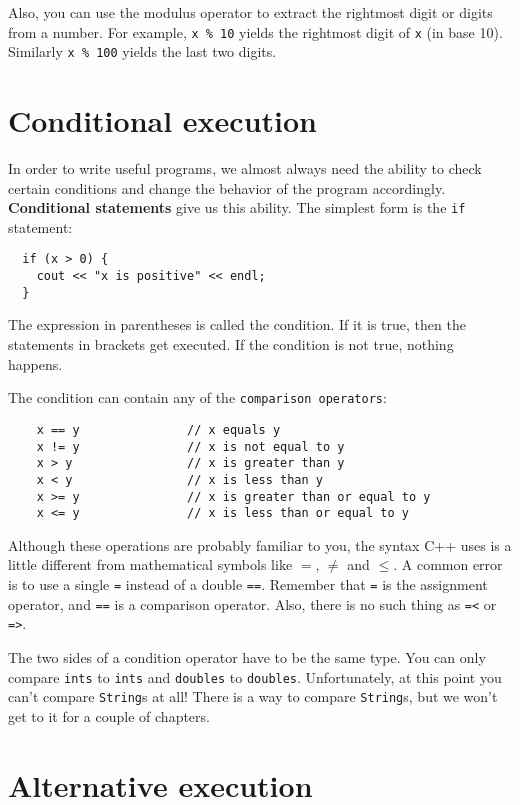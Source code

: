 Also, you can use the modulus operator to extract the rightmost
digit or digits from a number.  For example, {\tt x \% 10} yields
the rightmost digit of {\tt x} (in base 10).  Similarly
{\tt x \% 100} yields the last two digits.

\section{Conditional execution}

In order to write useful programs, we almost always need the ability
to check certain conditions and change the behavior of the program
accordingly.  {\bf Conditional statements} give us this ability.  The
simplest form is the {\tt if} statement:

\begin{lstlisting}
  if (x > 0) {
    cout << "x is positive" << endl;
  }
\end{lstlisting}
%
The expression in parentheses is called the condition.
If it is true, then the statements in brackets get executed.
If the condition is not true, nothing happens.


The condition can contain any of the {\tt comparison operators}:

\begin{lstlisting}
    x == y               // x equals y
    x != y               // x is not equal to y
    x > y                // x is greater than y
    x < y                // x is less than y
    x >= y               // x is greater than or equal to y
    x <= y               // x is less than or equal to y
\end{lstlisting}
%
Although these operations are probably familiar to you, the
syntax C++ uses is a little different from mathematical
symbols like $=$, $\neq$ and $\le$.  A common error is
to use a single {\tt =} instead of a double {\tt ==}.  Remember
that {\tt =} is the assignment operator, and {\tt ==} is
a comparison operator.  Also, there is no such thing as
{\tt =<} or {\tt =>}.

The two sides of a condition operator have to be the same
type.  You can only compare {\tt ints} to {\tt ints} and
{\tt doubles} to {\tt doubles}.  Unfortunately, at this
point you can't compare {\tt String}s at all!  There is
a way to compare {\tt String}s, but we won't get to it for a couple
of chapters.

\section {Alternative execution}
\label{alternative}

